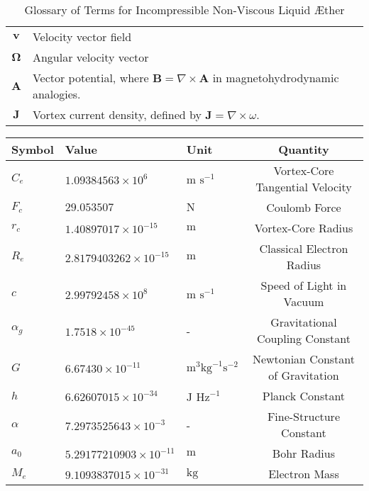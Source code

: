 \begin{table}[htbp]
\begin{tabular}{c l}
            \( \mathbf{v} \) & Velocity vector field \\
            \( \mathbf{\Omega} \) & Angular velocity vector \\
            \( \mathbf{A} \) & Vector potential, where \( \mathbf{B} = \nabla \times \mathbf{A} \) in magnetohydrodynamic analogies. \\
            \( \mathbf{J} \) & Vortex current density, defined by \( \mathbf{J} = \nabla \times \omega \). \\
            \bottomrule
        \end{tabular}
        \caption{Glossary of Terms for Incompressible Non-Viscous Liquid Æther}
        \label{tab:symbols}
    \end{table}
    \begin{table}[htbp]
        \centering
        \renewcommand{\arraystretch}{1.0}
        \begin{tabular}{lllc}
            \toprule
            \textbf{Symbol} & \textbf{Value} & \textbf{Unit} & \textbf{Quantity} \\
            \midrule
            $C_e$ & $1.09384563 \times 10^6$ & $\text{m s}^{-1}$ & Vortex-Core Tangential Velocity \\
            $F_c$ & $29.053507$ & $\text{N}$ & Coulomb Force \\
            $r_c$ & $1.40897017 \times 10^{-15}$ & $\text{m}$ & Vortex-Core Radius \\
            $R_e$ & $2.8179403262 \times 10^{-15}$ & $\text{m}$ & Classical Electron Radius \\
            $c$ & $2.99792458 \times 10^8$ & $\text{m s}^{-1}$ & Speed of Light in Vacuum \\
            $\alpha_g$ & $1.7518 \times 10^{-45}$ & - & Gravitational Coupling Constant \\
            $G$ & $6.67430 \times 10^{-11}$ & $\text{m}^3 \text{kg}^{-1} \text{s}^{-2}$ & Newtonian Constant of Gravitation \\
            $h$ & $6.62607015 \times 10^{-34}$ & $\text{J Hz}^{-1}$ & Planck Constant \\
            $\alpha$ & $7.2973525643 \times 10^{-3}$ & - & Fine-Structure Constant \\
            $a_0$ & $5.29177210903 \times 10^{-11}$ & $\text{m}$ & Bohr Radius \\
            $M_e$ & $9.1093837015 \times 10^{-31}$ & $\text{kg}$ & Electron Mass \\

\end{tabular}
\end{table}
